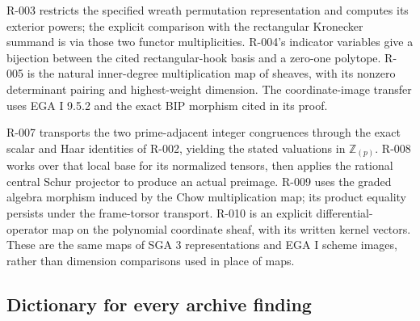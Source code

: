 \documentclass[
  10pt,
]{article}
\begin{document}
R-003 restricts the specified wreath permutation representation and
computes its exterior powers; the explicit comparison with the
rectangular Kronecker summand is via those two functor multiplicities.
R-004's indicator variables give a bijection between the cited
rectangular-hook basis and a zero-one polytope. R-005 is the natural
inner-degree multiplication map of sheaves, with its nonzero determinant
pairing and highest-weight dimension. The coordinate-image transfer uses
EGA I 9.5.2 and the exact BIP morphism cited in its proof.

R-007 transports the two prime-adjacent integer congruences through the
exact scalar and Haar identities of R-002, yielding the stated
valuations in \(\mathbb Z_{(p)}\). R-008 works over that local base for
its normalized tensors, then applies the rational central Schur
projector to produce an actual preimage. R-009 uses the graded algebra
morphism induced by the Chow multiplication map; its product equality
persists under the frame-torsor transport. R-010 is an explicit
differential-operator map on the polynomial coordinate sheaf, with its
written kernel vectors. These are the same maps of SGA 3 representations
and EGA I scheme images, rather than dimension comparisons used in place
of maps.

\subsection{Dictionary for every archive
finding}\label{dictionary-for-every-archive-finding}
\end{document}
